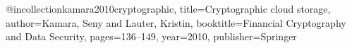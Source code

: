 @incollection{kamara2010cryptographic,
  title={Cryptographic cloud storage},
  author={Kamara, Seny and Lauter, Kristin},
  booktitle={Financial Cryptography and Data Security},
  pages={136--149},
  year={2010},
  publisher={Springer}
}

